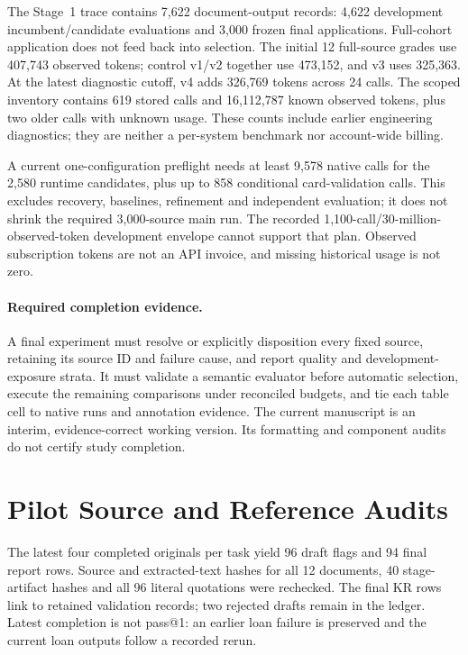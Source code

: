 \documentclass[11pt]{article}
\begin{document}
The Stage~1 trace contains 7,622 document-output records: 4,622 development
incumbent/candidate evaluations and 3,000 frozen final applications.
Full-cohort application does not feed back into selection.
The initial 12 full-source grades use 407,743 observed tokens; control
v1/v2 together use 473,152, and v3 uses 325,363. At the latest diagnostic
cutoff, v4 adds 326,769 tokens across 24 calls. The scoped inventory
contains 619 stored calls and 16,112,787 known
observed tokens, plus two older calls with unknown usage. These counts
include earlier engineering diagnostics; they are neither a per-system
benchmark nor account-wide billing.

A current one-configuration preflight needs at least 9,578 native calls
for the 2,580 runtime candidates, plus up to 858 conditional card-validation
calls. This excludes recovery, baselines, refinement and independent
evaluation; it does not shrink the required 3,000-source main run.
The recorded 1,100-call/30-million-observed-token development envelope
cannot support that plan. Observed subscription tokens are not an API
invoice, and missing historical usage is not zero.

\paragraph{Required completion evidence.}
A final experiment must resolve or explicitly disposition every fixed
source, retaining its source ID and failure cause, and report quality and
development-exposure strata. It must validate a semantic evaluator before
automatic selection, execute the remaining comparisons under reconciled
budgets, and tie each table cell to native runs and annotation evidence.
The current manuscript is an interim, evidence-correct working version.
Its formatting and component audits do not certify study completion.

\section{Pilot Source and Reference Audits}
\label{sec:reference-repair}
The latest four completed originals per task yield 96 draft flags and
94 final report rows. Source and extracted-text hashes for all 12 documents,
40 stage-artifact hashes and all 96 literal quotations were rechecked.
The final KR rows link to retained validation records; two rejected drafts
remain in the ledger. Latest completion is not pass@1: an earlier loan
failure is preserved and the current loan outputs follow a recorded rerun.
\end{document}
